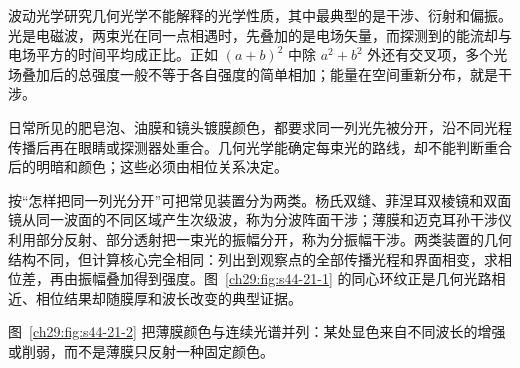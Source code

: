 \newcommand{\NewtonRingsDiagram}{%
\begin{center}\begin{minipage}{\linewidth}\centering\begin{tikzpicture}[scale=.92,>=Latex]
 \begin{scope}
  \draw[very thick](-2.5,0)--(2.5,0);
  \draw[very thick,domain=-2.2:2.2,samples=101]plot(\x,{4-sqrt(16-\x*\x)});
  \draw[thick](-2.2,{4-sqrt(16-2.2*2.2)})--(-2.2,1.1)--(2.2,1.1)--(2.2,{4-sqrt(16-2.2*2.2)});
  \fill(0,0)circle(1.3pt)node[below left]{$O$};
  \draw[<->](1.8,0)--(1.8,{4-sqrt(16-1.8*1.8)})node[midway,right=4pt]{$t(r)$};
  \draw[<->](0,-.65)--(1.8,-.65)node[midway,below]{$r$};
  \node[above]at(0,1.15){平凸透镜};\node[below]at(-1.1,-1.15){底板（透明玻璃特例）};
 \end{scope}
 \begin{scope}[shift={(6,0)}]
  \foreach \m in {1,...,7}{\draw[DeepBlue](0,0)circle({.55*sqrt(\m)});}
  \fill(0,0)circle(.06);\node[below]at(0,-1.65){暗环满足 $r_m^2=m\lambda R$};
 \end{scope}
\end{tikzpicture}\figcap{牛顿环的接触几何与暗环半径。球面在 $O$ 与平板相切，$t(r)$ 两端分别落在平板和球面；环半径按平方级次生成。\label{ch29:fig:newton}}\end{minipage}\end{center}}


波动光学研究几何光学不能解释的光学性质，其中最典型的是干涉、衍射和偏振。光是电磁波，两束光在同一点相遇时，先叠加的是电场矢量，而探测到的能流却与电场平方的时间平均成正比。正如 $(a+b)^2$ 中除 $a^2+b^2$ 外还有交叉项，多个光场叠加后的总强度一般不等于各自强度的简单相加；能量在空间重新分布，就是干涉。

日常所见的肥皂泡、油膜和镜头镀膜颜色，都要求同一列光先被分开，沿不同光程传播后再在眼睛或探测器处重合。几何光学能确定每束光的路线，却不能判断重合后的明暗和颜色；这些必须由相位关系决定。

按“怎样把同一列光分开”可把常见装置分为两类。杨氏双缝、菲涅耳双棱镜和双面镜从同一波面的不同区域产生次级波，称为分波阵面干涉；薄膜和迈克耳孙干涉仪利用部分反射、部分透射把一束光的振幅分开，称为分振幅干涉。两类装置的几何结构不同，但计算核心完全相同：列出到观察点的全部传播光程和界面相变，求相位差，再由振幅叠加得到强度。图~\ref{ch29:fig:s44-21-1} 的同心环纹正是几何光路相近、相位结果却随膜厚和波长改变的典型证据。

\InterferencePhenomenaPanel
图~\ref{ch29:fig:s44-21-2} 把薄膜颜色与连续光谱并列：某处显色来自不同波长的增强或削弱，而不是薄膜只反射一种固定颜色。



